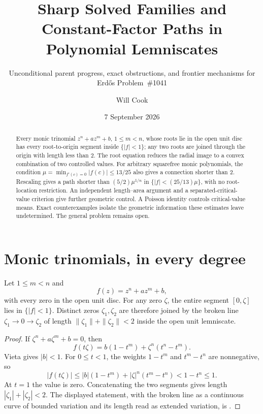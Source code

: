 \documentclass[11pt]{article}
\title{Sharp Solved Families and\\Constant-Factor Paths in Polynomial Lemniscates}
\subtitle{Unconditional parent progress, exact obstructions, and frontier
mechanisms for Erd\H{o}s Problem~\#1041}
\author{Will Cook}
\date{7 September 2026}
\begin{document}
\maketitle
\noteprovenance

\begin{abstract}
Every monic trinomial $z^n+az^m+b$, $1\le m<n$, whose roots lie in the open
unit disc has every root-to-origin segment inside $\{|f|<1\}$; any two
roots are joined through the origin with length less than $2$.
The root equation reduces the radial image to a convex combination of two
controlled values.  For arbitrary squarefree monic polynomials, the condition
$\mu=\min_{f'(c)=0}|f(c)|\le13/25$ also gives a connection shorter than $2$.
Rescaling gives a path shorter than $(5/2)\mu^{1/n}$ in
$\{|f|<(25/13)\mu\}$, with no root-location restriction.  An independent
length--area argument and a separated-critical-value criterion give further
geometric control.  A Poisson identity
controls critical-value means.  Exact counterexamples isolate the geometric
information these estimates leave undetermined.  The general problem remains
open.
\end{abstract}

\section{Monic trinomials, in every degree}
\label{sec:trinomial}

\begin{theorem}
\label{res:trinomial-all-degree}
Let $1\le m<n$ and
\[
 f(z)=z^n+az^m+b,
\]
with every zero in the open unit disc.  For any zero $\zeta$, the entire
segment $[0,\zeta]$ lies in $\{|f|<1\}$.  Distinct zeros $\zeta_1,\zeta_2$
are therefore joined by the broken line $\zeta_1\to0\to\zeta_2$ of length
$\|\zeta_1\|+\|\zeta_2\|<2$ inside the open unit lemniscate.
\end{theorem}

\begin{proof}
If $\zeta^n+a\zeta^m+b=0$, then
\[
 f(t\zeta)=b(1-t^m)+\zeta^n(t^n-t^m).
\]
Vieta gives $|b|<1$.  For $0\le t<1$, the weights $1-t^m$ and $t^m-t^n$
are nonnegative, so
\[
 |f(t\zeta)|\le |b|(1-t^m)+|\zeta|^n(t^m-t^n)
 <1-t^n\le1.
\]
At $t=1$ the value is zero.  Concatenating the two segments gives length
$|\zeta_1|+|\zeta_2|<2$.
The displayed statement, with the broken line as a continuous curve of bounded
variation and its length read as extended variation, is
.
\end{proof}
\end{document}
